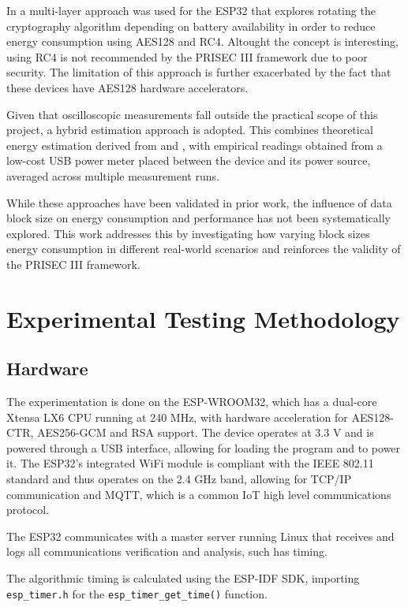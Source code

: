 \documentclass[METI_NISS]{IEEEtran}
\begin{document}
In \cite{rafat2025} a multi-layer approach was used for the ESP32 that explores rotating the cryptography algorithm depending on battery availability in order to reduce energy consumption using AES128 and RC4. Altought the concept is interesting, using RC4 is not recommended by the PRISEC III framework due to poor security. The limitation of this approach is further exacerbated by the fact that these devices have AES128 hardware accelerators.

Given that oscilloscopic measurements fall outside the practical scope of this project, a hybrid estimation approach is adopted. This combines theoretical energy estimation derived from \cite{maitra2019} and \cite{patterson2025}, with empirical readings obtained from a low-cost USB power meter placed between the device and its power source, averaged across multiple measurement runs.

While these approaches have been validated in prior work, the influence of data block size on energy consumption and performance has not been systematically explored. This work addresses this by investigating how varying block sizes energy consumption in different real-world scenarios and reinforces the validity of the PRISEC III framework.


\section{Experimental Testing Methodology}
\subsection{Hardware}\label{AA}
The experimentation is done on the ESP-WROOM32, which has a dual-core Xtensa LX6 CPU running at 240 MHz, with hardware acceleration for AES128-CTR, AES256-GCM and RSA support. The device operates at 3.3 V and is powered through a USB interface, allowing for loading the program and to power it. The ESP32’s integrated WiFi module is compliant with the IEEE 802.11 standard and thus operates on the 2.4 GHz band, allowing for TCP/IP communication and MQTT, which is a common IoT high level communications protocol.

The ESP32 communicates with a master server running Linux that receives and logs all communications verification and analysis, such has timing.

The algorithmic timing is calculated using the ESP-IDF SDK, importing \texttt{esp\_timer.h} for the \texttt{esp\_timer\_get\_time()} function.
\end{document}
